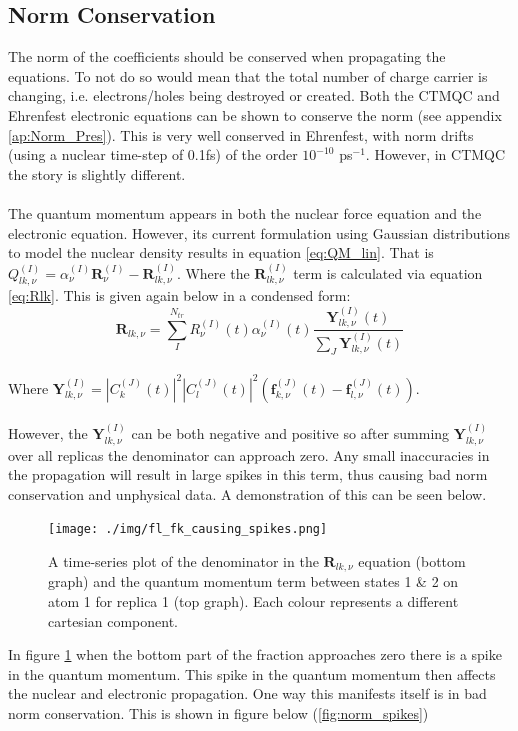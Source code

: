 \subsection{Norm Conservation}
The norm of the coefficients should be conserved when propagating the equations. To not do so would mean that the total number of charge carrier is changing, i.e. electrons/holes being destroyed or created. Both the CTMQC and Ehrenfest electronic equations can be shown to conserve the norm (see appendix \ref{ap:Norm_Pres}). This is very well conserved in Ehrenfest, with norm drifts (using a nuclear time-step of 0.1fs) of the order $10^{-10}$ ps$^{-1}$. However, in CTMQC the story is slightly different.
\\\\
The quantum momentum appears in both the nuclear force equation and the electronic equation. However, its current formulation using Gaussian distributions to model the nuclear density results in equation \eqref{eq:QM_lin}. That is $Q_{lk,\nu}^{(I)} = \alpha_{\nu}^{(I)}\textbf{R}^{(I)}_\nu - \textbf{R}^{(I)}_{lk, \nu}$. Where the $\textbf{R}^{(I)}_{lk, \nu}$ term is calculated via equation \eqref{eq:Rlk}. This is given again below in a condensed form:
\[\textbf{R}_{lk, \nu} = \sum_{I}^{N_{tr}} R_{\nu}^{(I)}(t) \alpha_{\nu}^{(I)}(t) \frac{\textbf{Y}^{(I)}_{lk, \nu}(t)}{\sum_{J} \textbf{Y}^{(I)}_{lk, \nu}(t)} \]
\\
Where $\textbf{Y}^{(I)}_{lk, \nu} = |C_{k}^{(J)}(t)|^2 |C_{l}^{(J)}(t)|^2 \left( \textbf{f}_{k, \nu}^{(J)}(t) - \textbf{f}_{l, \nu}^{(J)}(t) \right)$.
\\\\
However, the $\textbf{Y}^{(I)}_{lk, \nu}$ can be both negative and positive so after summing $\textbf{Y}^{(I)}_{lk, \nu}$ over all replicas the denominator can approach zero. Any small inaccuracies in the propagation will result in large spikes in this term, thus causing bad norm conservation and unphysical data. A demonstration of this can be seen below.
\begin{figure}[H]
  \texttt{[image: ./img/fl\_fk\_causing\_spikes.png]}
  \caption{\label{fig:flk_causing_spikes} A time-series plot of the denominator in the $\textbf{R}_{lk,\nu}$ equation (bottom graph) and the quantum momentum term between states 1 \& 2 on atom 1 for replica 1 (top graph). Each colour represents a different cartesian component.}
\end{figure}
\noindent In figure \ref{fig:flk_causing_spikes} when the bottom part of the fraction approaches zero there is a spike in the quantum momentum. This spike in the quantum momentum then affects the nuclear and electronic propagation. One way this manifests itself is in bad norm conservation. This is shown in figure below (\ref{fig:norm_spikes})
